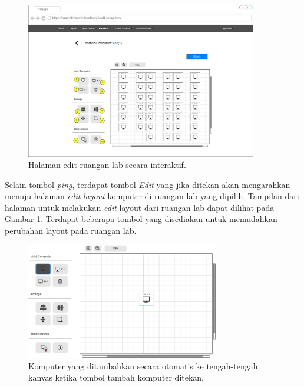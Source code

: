 \documentclass[a4paper,twoside]{article}
\begin{document}
\begin{enumerate}
\begin{itemize}
\begin{itemize}
                  \begin{figure}[H]
                    \centering
                    \includegraphics[width=0.9\textwidth]{images/ui designs/room-management/edit-computers.png}
                    \caption{Halaman edit ruangan lab secara interaktif.}
                    \label{fig:room-mgmt-edit-computers}
                \end{figure}
                
                Selain tombol \textit{ping}, terdapat tombol \textit{Edit} yang jika ditekan akan mengarahkan menuju halaman \textit{edit} \textit{layout} komputer di ruangan lab yang dipilih. Tampilan dari halaman untuk melakukan \textit{edit} layout dari ruangan lab dapat dilihat pada Gambar \ref{fig:room-mgmt-edit-computers}. Terdapat beberapa tombol yang disediakan untuk memudahkan perubahan layout pada ruangan lab.
                
                
                  \begin{figure}[H]
                    \centering
                    \includegraphics[width=0.75\textwidth]{images/ui designs/room-management/add-single-1.png}
                    \caption{Komputer yang ditambahkan secara otomatis ke tengah-tengah kanvas ketika tombol tambah komputer ditekan.}
                    \label{fig:room-mgmt-edit-computers-add-single}
                \end{figure}
                

\end{itemize}
\end{itemize}
\end{enumerate}
\end{document}
